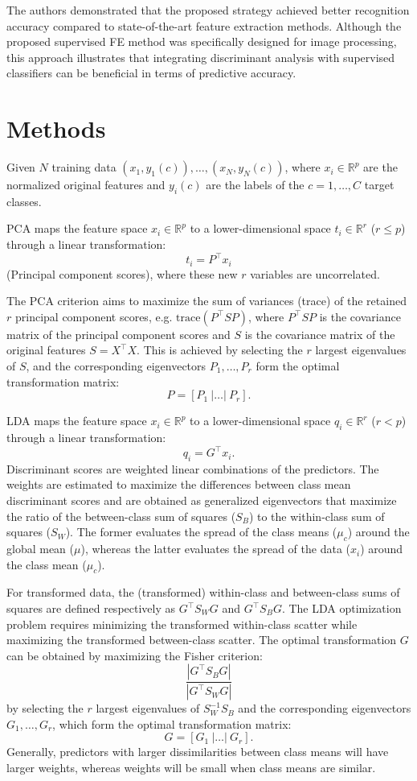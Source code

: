 \documentclass[11pt,a4paper]{article}
\begin{document}
The authors demonstrated that the proposed strategy achieved better recognition accuracy compared to state-of-the-art feature extraction methods.  
Although the proposed supervised FE method was specifically designed for image processing, this approach illustrates that integrating discriminant analysis with supervised classifiers can be beneficial in terms of predictive accuracy.



\section{Methods}


Given $N$ training data $(x_1, y_1(c)), \dots, (x_N, y_N(c))$, where $x_i \in \mathbb{R}^p$ are the normalized original features and $y_i(c)$ are the labels of the $c = 1, \dots, C$ target classes.  

PCA maps the feature space $x_i \in \mathbb{R}^p$ to a lower-dimensional space $t_i \in \mathbb{R}^r$ ($r \leq p$) through a linear transformation:
\[
t_i = P^\top x_i
\]
(Principal component scores), where these new $r$ variables are uncorrelated.

The PCA criterion aims to maximize the sum of variances (trace) of the retained $r$ principal component scores, e.g. $\text{trace}(P^\top S P)$, where $P^\top S P$ is the covariance matrix of the principal component scores and $S$ is the covariance matrix of the original features $S = X^\top X$.  
This is achieved by selecting the $r$ largest eigenvalues of $S$, and the corresponding eigenvectors $P_1, \dots, P_r$ form the optimal transformation matrix:
\[
P = [P_1 \ | \dots | \ P_r].
\]

LDA maps the feature space $x_i \in \mathbb{R}^p$ to a lower-dimensional space $q_i \in \mathbb{R}^r$ ($r < p$) through a linear transformation:
\[
q_i = G^\top x_i.
\]
Discriminant scores are weighted linear combinations of the predictors.  
The weights are estimated to maximize the differences between class mean discriminant scores and are obtained as generalized eigenvectors that maximize the ratio of the between-class sum of squares ($S_B$) to the within-class sum of squares ($S_W$).  
The former evaluates the spread of the class means ($\mu_c$) around the global mean ($\mu$), whereas the latter evaluates the spread of the data ($x_i$) around the class mean ($\mu_c$).

For transformed data, the (transformed) within-class and between-class sums of squares are defined respectively as $G^\top S_W G$ and $G^\top S_B G$.  
The LDA optimization problem requires minimizing the transformed within-class scatter while maximizing the transformed between-class scatter.  
The optimal transformation $G$ can be obtained by maximizing the Fisher criterion:
\[
\frac{|G^\top S_B G|}{|G^\top S_W G|}
\]
by selecting the $r$ largest eigenvalues of $S_W^{-1} S_B$ and the corresponding eigenvectors $G_1, \dots, G_r$, which form the optimal transformation matrix:
\[
G = [G_1 \ | \dots | \ G_r].
\]
Generally, predictors with larger dissimilarities between class means will have larger weights, whereas weights will be small when class means are similar.
\end{document}
